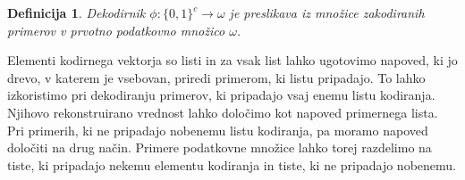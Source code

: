 \documentclass[12pt,a4paper]{article}
\newtheorem{definicija}{Definicija}
\begin{document}
\begin{definicija}

		Dekodirnik $\phi: \{0,1\}^c \rightarrow \omega$ je preslikava iz množice zakodiranih primerov v prvotno podatkovno množico $\omega$.


\end{definicija}

Elementi kodirnega vektorja so listi in za vsak list lahko ugotovimo napoved, ki jo drevo, v katerem je vsebovan, priredi primerom, ki listu pripadajo.
To lahko izkoristimo pri dekodiranju primerov, ki pripadajo vsaj enemu listu kodiranja. 
Njihovo rekonstruirano vrednost lahko določimo kot napoved primernega lista.
Pri primerih, ki ne pripadajo nobenemu listu kodiranja, pa moramo napoved določiti na drug način.
Primere podatkovne množice lahko torej razdelimo na tiste, ki pripadajo nekemu elementu kodiranja in tiste, ki ne pripadajo nobenemu.
\end{document}
